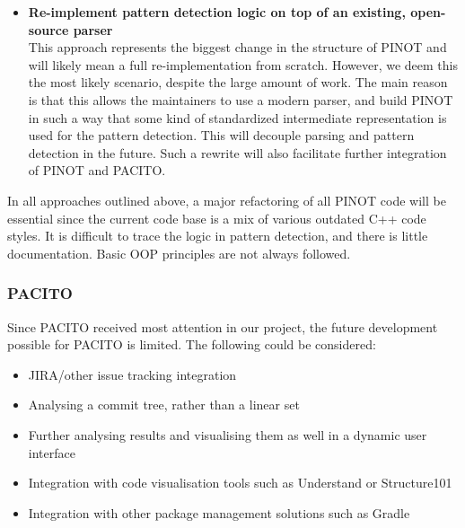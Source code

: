 \begin{itemize}
    \item {\bf Re-implement pattern detection logic on top of an existing, open-source parser}\\
    This approach represents the biggest change in the structure of PINOT and will likely mean a full re-implementation from scratch. However, we deem this the most likely scenario, despite the large amount of work. The main reason is that this allows the maintainers to use a modern parser, and build PINOT in such a way that some kind of standardized intermediate representation is used for the pattern detection. This will decouple parsing and pattern detection in the future. Such a rewrite will also facilitate further integration of PINOT and PACITO.
\end{itemize}

In all approaches outlined above, a major refactoring of all PINOT code will be essential since the current code base is a mix of various outdated C++ code styles. It is difficult to trace the logic in pattern detection, and there is little documentation. Basic OOP principles are not always followed.

\subsubsection{PACITO}
Since PACITO received most attention in our project, the future development possible for PACITO is limited. The following could be considered:
\begin{itemize}
    \item JIRA/other issue tracking integration
    \item Analysing a commit tree, rather than a linear set
    \item Further analysing results and visualising them as well in a dynamic user interface
    \item Integration with code visualisation tools such as Understand or Structure101
    \item Integration with other package management solutions such as Gradle
\end{itemize}